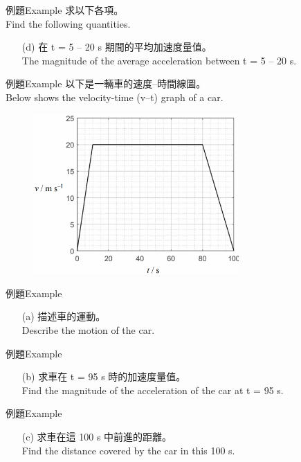 \documentclass[beamer=true]{standalone}
\begin{document}
\begin{frame}[t]{例題Example}
    求以下各項。 \\Find the following quantities.
    \begin{itemize}
        \item [(d)]在 t = 5 – 20 s 期間的平均加速度量值。 \\The magnitude of the average acceleration between t = 5 – 20 s.
    \end{itemize}
\end{frame}
\begin{frame}[t]{例題Example}
    以下是一輛車的速度–時間線圖。 \\Below shows the velocity-time (v–t) graph of a car.
    \begin{figure}[h!]
        \centering
        \includegraphics[width=0.7\textwidth]{../../assets/595e8206.png}
    \end{figure}
\end{frame}
\begin{frame}[t]{例題Example}
    \begin{itemize}
        \item [(a)]描述車的運動。 \\Describe the motion of the car.
    \end{itemize}
\end{frame}
\begin{frame}[t]{例題Example}
    \begin{itemize}
        \item [(b)]求車在 t = 95 s 時的加速度量值。 \\Find the magnitude of the acceleration of the car at t = 95 s.
    \end{itemize}
\end{frame}
\begin{frame}[t]{例題Example}
    \begin{itemize}
        \item [(c)]求車在這 100 s 中前進的距離。 \\Find the distance covered by the car in this 100 s.
    \end{itemize}
\end{frame}
\end{document}

